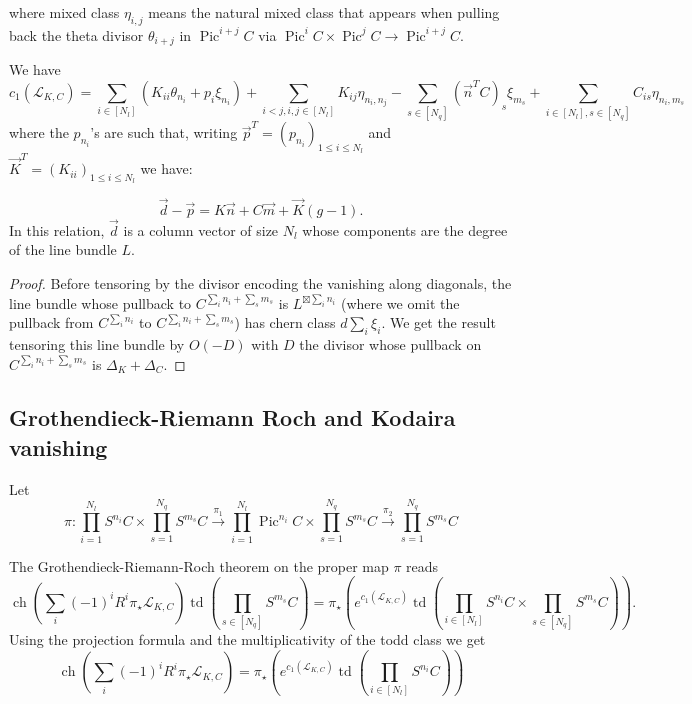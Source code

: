 \documentclass{article}
\theoremstyle{definition}
\DeclareMathOperator{\pic}{\text{Pic}}
\DeclareMathOperator{\ch}{ch}
\DeclareMathOperator{\td}{td}
\renewcommand{\leq}{\leqslant}
\begin{document}
where mixed class $\eta_{i,j}$ means the natural mixed class that appears when pulling back the theta divisor $\theta_{i+j}$ in $\pic^{i+j} C$ via $\pic^{i} C \times \pic^j C \to \pic^{i+j} C$.


\begin{proposition}
We have 
$$c_1(\mathcal{L}_{K,C})=\sum_{i\in [{N_l}]} (K_{ii}\theta_{n_i} + p_i \xi_{n_i}) + \sum_{i<j,i,j\in [{N_l}]} K_{ij}\eta_{n_i,n_j} - \sum_{s\in [{N_q}]} (\vec{n}^T C)_s \xi_{m_s} + \sum_{i\in [{N_l}], s\in [{N_q}]} C_{is}\eta_{n_i,m_s}$$
where the $p_{n_i}$'s are such that, writing $\vec{p}^T=(p_{n_i})_{1\leq i \leq {N_l}}$ and $\vec{K}^T=(K_{ii})_{1\leq i \leq {N_l}}$ we have: 

\begin{equation}
\label{eq:configfirst}
\vec{d} - \vec{p} = K \vec{n} + C \vec{m} + \vec{K} (g-1).
\end{equation}
In this relation, $\vec{d}$ is a column vector of size ${N_l}$ whose components are the degree of the line bundle $L$.


\begin{proof}
Before tensoring by the divisor encoding the vanishing along diagonals, the line bundle whose pullback to $C^{\sum_i n_i+\sum_s m_s}$ is $L^{\boxtimes \sum_i n_i}$ (where we omit the pullback from $C^{\sum_i n_i}$ to $C^{\sum_i n_i+\sum_s m_s}$) has chern class $d\sum_i \xi_i$. We get the result tensoring this line bundle by $O(-D)$ with $D$ the divisor whose pullback on $C^{\sum_i n_i+\sum_s m_s}$ is $\Delta_K+\Delta_C$.
\end{proof}

\end{proposition}


\subsection{Grothendieck-Riemann Roch and Kodaira vanishing}
Let
$$\pi: \prod_{i=1}^{N_l} S^{n_i} C \times\prod_{s=1}^{N_q} S^{m_s}C \overset{\pi_1}{\to} \prod_{i=1}^{N_l} \pic^{n_i} C \times\prod_{s=1}^{N_q} S^{m_s}C \overset{\pi_2}{\to} \prod_{s=1}^{N_q} S^{m_s}C$$



The Grothendieck-Riemann-Roch theorem on the proper map $\pi$ reads 
$$\ch\left(\sum_i (-1)^iR^i \pi_\star \mathcal{L}_{K,C}\right) \td \left(\prod_{s\in [{N_q}]} S^{m_s}C\right) =\pi_\star \left(e^{c_1(\mathcal{L}_{K,C})} \td\left(\prod_{i\in [{N_l}]} S^{n_i}C \times \prod_{s\in [{N_q}]} S^{m_s}C\right)\right).$$ Using the projection formula and the multiplicativity of the todd class we get
$$\ch\left(\sum_i (-1)^iR^i \pi_\star \mathcal{L}_{K,C}\right) = \pi_\star \left(e^{c_1(\mathcal{L}_{K,C})} \td\left(\prod_{i\in [{N_l}]} S^{n_i}C \right)\right)$$ 
\end{document}
